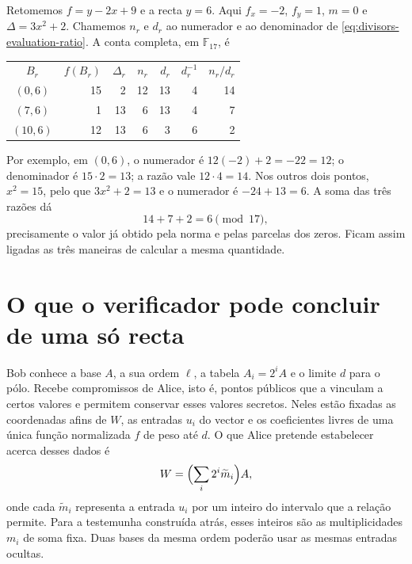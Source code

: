 Retomemos \(f=y-2x+9\) e a recta \(y=6\). Aqui
\(f_x=-2\), \(f_y=1\), \(m=0\) e
\(\Delta=3x^2+2\). Chamemos \(n_r\) e \(d_r\) ao numerador
e ao denominador de \eqref{eq:divisors-evaluation-ratio}. A conta
completa, em \(\mathbb F_{17}\), é
\begin{center}
\begin{tabular}{c r r r r r r}
\(B_r\)&\(f(B_r)\)&\(\Delta_r\)&\(n_r\)&\(d_r\)&\(d_r^{-1}\)&\(n_r/d_r\)\\[1mm]
\((0,6)\)&15&2&12&13&4&14\\
\((7,6)\)&1&13&6&13&4&7\\
\((10,6)\)&12&13&6&3&6&2
\end{tabular}
\end{center}
Por exemplo, em \((0,6)\), o numerador é
\(12(-2)+2=-22=12\); o denominador é
\(15\cdot2=13\); a razão vale \(12\cdot4=14\).
Nos outros dois pontos, \(x^2=15\), pelo que
\(3x^2+2=13\) e o numerador é \(-24+13=6\).
A soma das três razões dá
\[
 14+7+2=6\pmod {17},
\]
precisamente o valor já obtido pela norma e pelas parcelas dos zeros.
Ficam assim ligadas as três maneiras de calcular a mesma quantidade.

\section{O que o verificador pode concluir de uma só recta}
\label{sec:divisors-arithmetic-certificate}
\label{sec:divisors-cost-and-composition}

Bob conhece a base \(A\), a sua ordem \(\ell\), a tabela
\(A_i=2^iA\) e o limite \(d\) para o pólo. Recebe compromissos de
Alice, isto é, pontos públicos que a vinculam a certos valores e
permitem conservar esses valores secretos. Neles estão fixadas as
coordenadas afins de \(W\), as entradas \(u_i\) do vector e os
coeficientes livres de uma única função normalizada \(f\) de peso
até \(d\). O que Alice pretende estabelecer acerca desses dados é
\[
 W=\Bigl(\sum_i 2^i\widetilde m_i\Bigr)A,
\]
onde cada \(\widetilde m_i\) representa a entrada \(u_i\) por um
inteiro do intervalo que a relação permite. Para a testemunha construída
atrás, esses inteiros são as multiplicidades \(m_i\) de soma fixa.
Duas bases da mesma ordem poderão usar as mesmas entradas ocultas.

